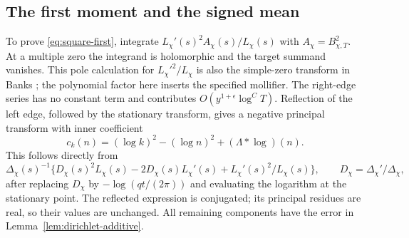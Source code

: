 \subsection{The first moment and the signed mean}
To prove \eqref{eq:square-first}, integrate
$L_\chi'(s)^2A_\chi(s)/L_\chi(s)$ with
$A_\chi=B_{\chi,T}^2$. At a multiple zero the integrand is holomorphic
and the target summand vanishes. This pole calculation for
$L_\chi'^2/L_\chi$ is also the simple-zero transform in
Banks \cite[Section~2, p.~3]{banks-simple-transform}; the polynomial
factor here inserts the specified mollifier. The right-edge series has no constant
term and contributes $O(y^{1+\epsilon}\log^C T)$. Reflection of the
left edge, followed by the stationary transform, gives a negative
principal transform with inner coefficient
\[
 c_k(n)=(\log k)^2-(\log n)^2+(\Lambda*\log)(n).
\]
This follows directly from
\[
 \Delta_\chi(s)^{-1}\{D_\chi(s)^2L_\chi(s)
       -2D_\chi(s)L_\chi'(s)+L_\chi'(s)^2/L_\chi(s)\},
 \qquad D_\chi=\Delta_\chi'/\Delta_\chi,
\]
after replacing $D_\chi$ by $-\log(qt/(2\pi))$ and evaluating the
logarithm at the stationary point. The reflected expression is
conjugated; its principal residues are real, so their values are
unchanged. All remaining components have the error in
Lemma~\ref{lem:dirichlet-additive}.

